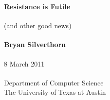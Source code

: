 \documentclass{beamer}
\begin{document}

\begin{frame}[plain]
\begin{center}
{\Huge \bf Resistance is Futile}
\ \\
\ \\
{\Large (and other good news)}
\ \\
\ \\
{\bf Bryan Silverthorn}
\ \\
\ \\
8 March 2011
\ \\
\ \\
Department of Computer Science\\
The University of Texas at Austin
\end{center}
\end{frame}







\end{document}
